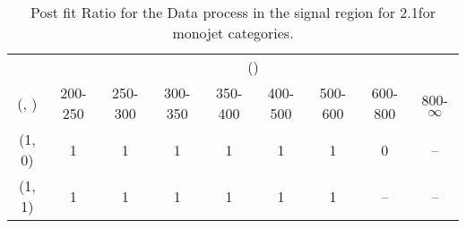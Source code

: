 \begin{table}[h!]
\tiny
\centering
\caption{Post fit Ratio for the Data process in the signal region for 2.1\ifb for monojet categories.\label{tab:ratioseppost_sig_data_mono}}
\begin{tabular}
{ccccccccc}
	\hline\hline
	& \multicolumn{8}{c}{\scalht (\gev)} \\ 
	 (\njet,  \nb) & 200-250 & 250-300 & 300-350 & 350-400 & 400-500 & 500-600 & 600-800 & 800-$\infty$ \\ [0.8ex] 
\hline
	(1, 0) & 1 & 1 & 1 & 1 & 1 & 1 & 0 & -- \\[0.5ex] 
	(1, 1) & 1 & 1 & 1 & 1 & 1 & 1 & -- & -- \\[0.5ex] 
	\hline
	\hline
\end{tabular}
\end{table}
